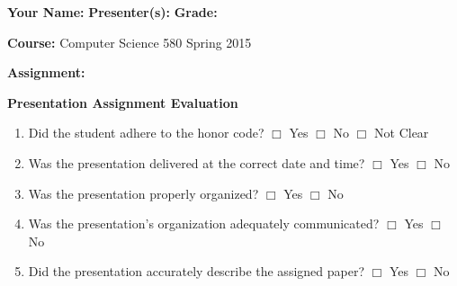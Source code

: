 \documentclass[letterpaper, 10pt]{article} %
\begin{document}
\pagestyle{empty}

\vspace*{-1.2in}

\noindent
{\bf Your Name:} \hspace*{2in} {\bf Presenter(s):} \hspace*{2in} {\bf Grade:} 

\vspace*{.1in}

\noindent
{\bf Course:} Computer Science 580 Spring 2015

\vspace*{.1in}

\noindent
{\bf Assignment:} 

\vspace*{.1in}

\large{

\begin{center}{\bf Presentation Assignment Evaluation} \end{center}

\begin{enumerate}

\setlength{\itemsep}{1pt}

\item Did the student adhere to the honor code? \hspace*{.05in}  $\Box$ Yes
  \hspace*{.05in} $\Box$ No \hspace*{.05in}  $\Box$ Not Clear

\item Was the presentation delivered at the correct date and
  time? \hspace*{.05in} $\Box$ Yes
  \hspace*{.05in} $\Box$ No

\item Was the presentation properly organized? \hspace*{.05in} $\Box$ Yes
  \hspace*{.05in} $\Box$ No 

\item Was the presentation's organization adequately
  communicated? \hspace*{.05in} $\Box$ Yes
  \hspace*{.05in} $\Box$ No

\item Did the presentation accurately describe the
  assigned paper? \hspace*{.05in} $\Box$ Yes
  \hspace*{.05in} $\Box$ No


\end{enumerate}}
\end{document}
